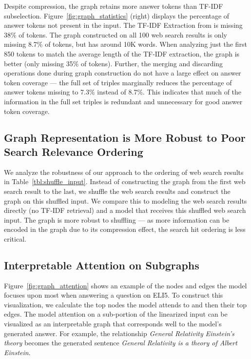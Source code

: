 \documentclass[11pt,a4paper]{article}
\begin{document}
Despite compression, the graph retains more answer tokens than TF-IDF subselection. Figure~\ref{fig:graph_statistics} (right) displays the percentage of answer tokens not present in the input. The TF-IDF Extraction from \cite{fan2019explain} is missing 38\% of tokens. The graph constructed on all 100 web search results is only missing 8.7\% of tokens, but has around 10K words. When analyzing just the first 850 tokens to match the average length of the TF-IDF extraction, the graph is better (only missing 35\% of  tokens). Further, the merging and discarding operations done during graph construction do not have a large effect on answer token coverage --- the full set of triples marginally reduces the percentage of answer tokens missing to 7.3\%  instead of 8.7\%. This indicates that much of the information in the full set triples is redundant and unnecessary for good answer token coverage.

\subsection{Graph Representation is More Robust to Poor Search Relevance Ordering}
We analyze the robustness of our approach to the ordering of web search results in Table~\ref{tbl:shuffle_input}. Instead of constructing the graph from the first web search result to the last, we shuffle the web search results and construct the graph on this shuffled input. We compare this to  modeling the web search results directly (no TF-IDF retrieval) and a model that receives this shuffled web search input. The graph is more robust to shuffling --- as more information can be encoded in the graph due to its compression effect, the search hit ordering is less critical. 

\subsection{Interpretable Attention on Subgraphs}

Figure~\ref{fig:graph_attention} shows an example of the nodes and edges the model focuses upon most when answering a question on ELI5. To construct this visualization, we calculate the top nodes the model attends to and then their top edges. The model attention on a sub-portion of the linearized input can be visualized as an interpretable graph that corresponds well to the model's generated answer. For example, the relationship \textit{General Relativity}  \textit{Einstein's theory} becomes the generated sentence \textit{General Relativity is a theory of Albert Einstein}. 
\end{document}
